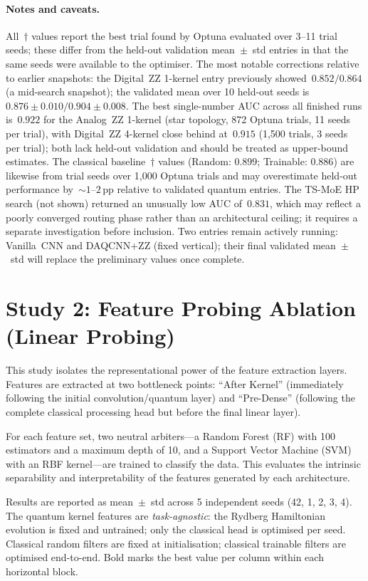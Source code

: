 \documentclass[11pt,a4paper]{article}
\begin{document}
\paragraph{Notes and caveats.}
All~$\dagger$ values report the best trial found by Optuna evaluated over 3--11 trial seeds; these differ from the held-out validation mean~$\pm$~std entries in that the same seeds were available to the optimiser. The most notable corrections relative to earlier snapshots: the Digital~ZZ 1-kernel entry previously showed~$0.852/0.864$ (a mid-search snapshot); the validated mean over 10 held-out seeds is~$0.876 \pm 0.010 / 0.904 \pm 0.008$. The best single-number AUC across all finished runs is~$0.922$ for the Analog~ZZ 1-kernel (star topology, 872 Optuna trials, 11 seeds per trial), with Digital~ZZ 4-kernel close behind at~$0.915$ (1,500 trials, 3 seeds per trial); both lack held-out validation and should be treated as upper-bound estimates.
The classical baseline~$\dagger$ values (Random: $0.899$; Trainable: $0.886$) are likewise from trial seeds over 1,000 Optuna trials and may overestimate held-out performance by~${\sim}1$--$2$\,pp relative to validated quantum entries. The TS-MoE HP search (not shown) returned an unusually low AUC of~$0.831$, which may reflect a poorly converged routing phase rather than an architectural ceiling; it requires a separate investigation before inclusion.
Two entries remain actively running: Vanilla~CNN and DAQCNN+ZZ (fixed vertical); their final validated mean~$\pm$~std will replace the preliminary values once complete.

\section{Study 2: Feature Probing Ablation (Linear Probing)}
This study isolates the representational power of the feature extraction layers. Features are extracted at two bottleneck points: ``After Kernel'' (immediately following the initial convolution/quantum layer) and ``Pre-Dense'' (following the complete classical processing head but before the final linear layer).

For each feature set, two neutral arbiters---a Random Forest (RF) with 100 estimators and a maximum depth of 10, and a Support Vector Machine (SVM) with an RBF kernel---are trained to classify the data. This evaluates the intrinsic separability and interpretability of the features generated by each architecture.

Results are reported as mean~$\pm$~std across 5 independent seeds (42, 1, 2, 3, 4). The quantum kernel features are \emph{task-agnostic}: the Rydberg Hamiltonian evolution is fixed and untrained; only the classical head is optimised per seed. Classical random filters are fixed at initialisation; classical trainable filters are optimised end-to-end. Bold marks the best value per column within each horizontal block.
\end{document}
